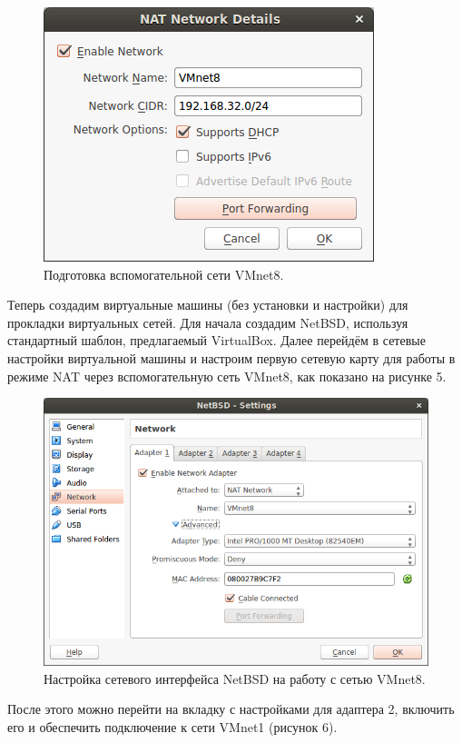 \begin{figure}[h!]
\centering
\includegraphics[scale=0.8]{res/virtualbox-nat}
\caption{Подготовка вспомогательной сети VMnet8.}
\end{figure}

Теперь создадим виртуальные машины (без установки и настройки) для прокладки виртуальных сетей. Для начала создадим NetBSD, используя стандартный шаблон, предлагаемый VirtualBox. Далее перейдём в сетевые настройки виртуальной машины и настроим первую сетевую карту для работы в режиме NAT через вспомогательную сеть VMnet8, как показано на рисунке 5.

\begin{figure}[h!]
\centering
\includegraphics[scale=0.6]{res/netbsd-nat}
\caption{Настройка сетевого интерфейса NetBSD на работу с сетью VMnet8.}
\end{figure}

После этого можно перейти на вкладку с настройками для адаптера 2, включить его и обеспечить подключение к сети VMnet1 (рисунок 6).

